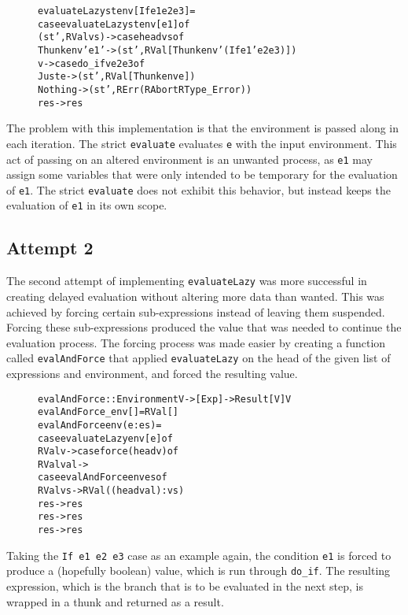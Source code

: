 \begin{figure}[H]
\begin{alltt}
  evaluateLazy st env [If e1 e2 e3]   =
    case evaluateLazy st env [e1] of
      (st', RVal vs)   -> case head vs of
        Thunk env' e1' -> (st', RVal [Thunk env' (If e1' e2 e3)])
        v              -> case do_if v e2 e3 of
          Just e  -> (st', RVal [Thunk env e])
          Nothing -> (st', RErr (RAbort RType_Error))
      res -> res
\end{alltt}
\end{figure}

The problem with this implementation is that the environment is passed along
in each iteration. The strict \texttt{evaluate} evaluates \texttt{e} with
the input environment. This act of passing on an altered environment is an
unwanted process, as \texttt{e1} may assign some variables that were only
intended to be temporary for the evaluation of \texttt{e1}. The strict
\texttt{evaluate} does not exhibit this behavior, but instead keeps the
evaluation of \texttt{e1} in its own scope.

\subsection{Attempt 2}
\label{lazySem:att2}
The second attempt of implementing \texttt{evaluateLazy} was more successful
in creating delayed evaluation without altering more data than wanted. This
was achieved by forcing certain sub-expressions instead of leaving them
suspended. Forcing these sub-expressions produced the value that was needed
to continue the evaluation process. The forcing process was made easier by
creating a function called \texttt{evalAndForce} that applied
\texttt{evaluateLazy} on the head of the given list of expressions and
environment, and forced the resulting value.

\begin{figure}[H]
\begin{alltt}
  evalAndForce :: Environment V -> [Exp] -> Result [V] V
  evalAndForce _env []    = RVal []
  evalAndForce env (e:es) =
    case evaluateLazy env [e] of
      RVal v -> case force (head v) of
        RVal val ->
          case evalAndForce env es of
            RVal vs -> RVal ((head val):vs)
            res -> res
        res -> res
      res -> res
\end{alltt}
\end{figure}

Taking the \texttt{If e1 e2 e3} case as an example again, the condition
\texttt{e1} is forced to produce a (hopefully boolean) value, which is run
through \texttt{do\_if}. The resulting expression, which is the branch that is
to be evaluated in the next step, is wrapped in a thunk and returned as a
result.

